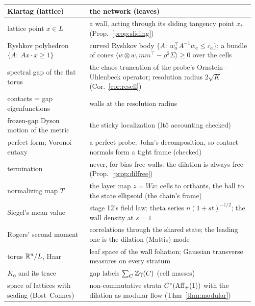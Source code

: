 \label{sec:summary}
\begin{center}\small
\begin{tabular}{>{\raggedright\arraybackslash}p{4.6cm}>{\raggedright\arraybackslash}p{9.6cm}}\toprule
Klartag (lattice) & the network (leaves)\\\midrule
lattice point $x\in L$ & a wall, acting through its sliding tangency point $x_*$ (Prop.~\ref{prop:sliding})\\
Ryshkov polyhedron $\{A:\ Ax\cdot x\ge1\}$ & curved Ryshkov body $\{A:\ w_a^\top A^{-1}w_a\le c_a\}$; a bundle of cones $\langle w\otimes w,mm^\top-\rho^2\Sigma\rangle\ge0$ over the cells\\
spectral gap of the flat torus & the chaos truncation of the probe's Ornstein--Uhlenbeck operator; resolution radius $2\sqrt K$ (Cor.~\ref{cor:resell})\\
contacts = gap eigenfunctions & walls at the resolution radius\\
frozen-gap Dyson motion of the metric & the sticky localization (It\^o accounting checked)\\
perfect form; Voronoi eutaxy & a perfect probe; John's decomposition, so contact normals form a tight frame (checked)\\
termination & never, for bias-free walls: the dilation is always free (Prop.~\ref{prop:dilfree})\\
normalizing map $T$ & the layer map $z=Wx$: cells to orthants, the ball to the state ellipsoid (the chain's frame)\\
Siegel's mean value & stage 12's field law; theta series $n(1+st)^{-1/2}$; the wall density at $s=1$\\
Rogers' second moment & correlations through the shared state; the leading one is the dilation (Mattis) mode\\
torus $\mathbb R^n/L$, Haar & leaf space of the wall foliation; Gaussian transverse measures on every stratum\\
$K_0$ and its trace & gap labels $\sum_C\mathbb Z\gamma(C)$ (cell masses)\\
space of lattices with scaling (Bost--Connes) & non-commutative strata $C^*(\mathrm{Aff}_+(1))$ with the dilation as modular flow (Thm~\ref{thm:modular})\\\bottomrule
\end{tabular}
\end{center}
